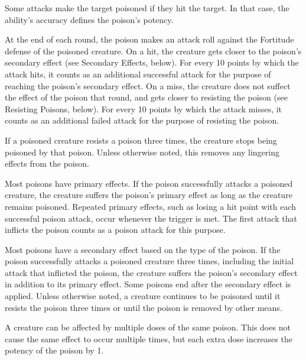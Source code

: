             Some attacks make the target poisoned if they hit the target.
            In that case, the ability's accuracy defines the poison's potency.

            \label{Potency}\label{Poison Potency}
            At the end of each round, the poison makes an attack roll against the Fortitude defense of the poisoned creature.
            On a hit, the creature gets closer to the poison's secondary effect (see Secondary Effects, below).
            For every 10 points by which the attack hits, it counts as an additional successful attack for the purpose of reaching the poison's secondary effect.
            On a miss, the creature does not suffect the effect of the poison that round, and gets closer to resisting the poison (see Resisting Poisons, below).
            For every 10 points by which the attack misses, it counts as an additional failed attack for the purpose of resisting the poison.

            If a poisoned creature resists a poison three times, the creature stops being poisoned by that poison.
            Unless otherwise noted, this removes any lingering effects from the poison.

            Most poisons have primary effects.
            If the poison successfully attacks a poisoned creature, the creature suffers the poison's primary effect as long as the creature remains poisoned.
            Repeated primary effects, such as losing a hit point with each successful poison attack, occur whenever the trigger is met.
            The first attack that inflicts the poison counts as a poison attack for this purpose.

            Most poisons have a secondary effect based on the type of the poison.
            If the poison successfully attacks a poisoned creature three times,
                including the initial attack that inflicted the poison,
                the creature suffers the poison's secondary effect in addition to its primary effect.
            Some poisons end after the secondary effect is applied.
            Unless otherwise noted, a creature continues to be poisoned until it resists the poison three times or until the poison is removed by other means.

            A creature can be affected by multiple doses of the same poison.
            This does not cause the same effect to occur multiple times, but each extra dose increases the potency of the poison by 1.

